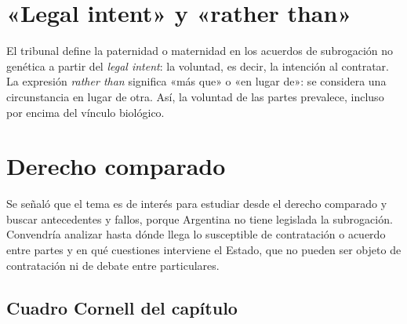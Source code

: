 \documentclass[12pt,oneside]{book}
\begin{document}
\section{«Legal intent» y «rather than»}

El tribunal define la paternidad o maternidad en los acuerdos de subrogación no genética a partir del \textit{legal intent}: la voluntad, es decir, la intención al contratar. La expresión \textit{rather than} significa «más que» o «en lugar de»: se considera una circunstancia en lugar de otra. Así, la voluntad de las partes prevalece, incluso por encima del vínculo biológico.

\section{Derecho comparado}

Se señaló que el tema es de interés para estudiar desde el derecho comparado y buscar antecedentes y fallos, porque Argentina no tiene legislada la subrogación. Convendría analizar hasta dónde llega lo susceptible de contratación o acuerdo entre partes y en qué cuestiones interviene el Estado, que no pueden ser objeto de contratación ni de debate entre particulares.

\subsection*{Cuadro Cornell del capítulo}
\end{document}
